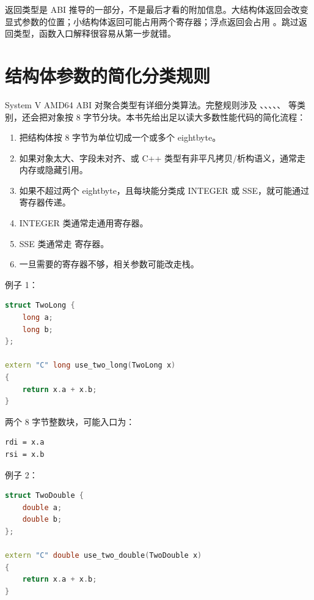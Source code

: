 \begin{warningbox}
返回类型是 ABI 推导的一部分，不是最后才看的附加信息。大结构体返回会改变显式参数的位置；小结构体返回可能占用两个寄存器；浮点返回会占用 。跳过返回类型，函数入口解释很容易从第一步就错。
\end{warningbox}

\section{结构体参数的简化分类规则}

System V AMD64 ABI 对聚合类型有详细分类算法。完整规则涉及 、、、、、 等类别，还会把对象按 8 字节分块。本书先给出足以读大多数性能代码的简化流程：

\begin{enumerate}
  \item 把结构体按 8 字节为单位切成一个或多个 eightbyte。
  \item 如果对象太大、字段未对齐、或 C++ 类型有非平凡拷贝/析构语义，通常走内存或隐藏引用。
  \item 如果不超过两个 eightbyte，且每块能分类成 INTEGER 或 SSE，就可能通过寄存器传递。
  \item INTEGER 类通常走通用寄存器。
  \item SSE 类通常走  寄存器。
  \item 一旦需要的寄存器不够，相关参数可能改走栈。
\end{enumerate}

例子 1：

\begin{lstlisting}[language=C++]
struct TwoLong {
    long a;
    long b;
};

extern "C" long use_two_long(TwoLong x)
{
    return x.a + x.b;
}
\end{lstlisting}

两个 8 字节整数块，可能入口为：

\begin{lstlisting}
rdi = x.a
rsi = x.b
\end{lstlisting}

例子 2：

\begin{lstlisting}[language=C++]
struct TwoDouble {
    double a;
    double b;
};

extern "C" double use_two_double(TwoDouble x)
{
    return x.a + x.b;
}
\end{lstlisting}


